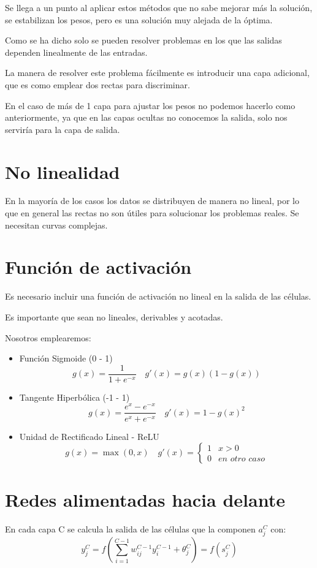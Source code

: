 \documentclass[12pt, twoside, openright]{report} %
\begin{document}
Se llega a un punto al aplicar estos métodos que no sabe mejorar más la solución, se estabilizan los pesos, pero es una solución muy alejada de la óptima.

Como se ha dicho solo se pueden resolver problemas en los que las salidas dependen linealmente de las entradas.

La manera de resolver este problema fácilmente es introducir una capa adicional, que es como emplear dos rectas para discriminar.

En el caso de más de 1 capa para ajustar los pesos no podemos hacerlo como anteriormente, ya que en las capas ocultas no conocemos la salida, solo nos serviría para la capa de salida.

\section{No linealidad}
En la mayoría de los casos los datos se distribuyen de manera no lineal, por lo que en general las rectas no son útiles para solucionar los problemas reales. Se necesitan curvas complejas.

\section{Función de activación}
Es necesario incluir una función de activación no lineal en la salida de las células. 

Es importante que sean no lineales, derivables y acotadas.
\pagebreak

Nosotros emplearemos:
\begin{itemize}
	\item Función Sigmoide (0 - 1)
	      $$g(x)=\frac{1}{1+e^{-x}}\quad g'(x)=g(x)(1-g(x))$$
	\item Tangente Hiperbólica (-1 - 1) $$g(x)=\frac{e^x-e^{-x}}{e^x+e^{-x}} \quad g'(x)=1-g(x)^2$$
	\item Unidad de Rectificado Lineal - ReLU $$g(x)=\max(0,x) \quad g'(x)= \begin{cases}1 & x > 0\\0 & \textit{en otro caso}\end{cases}$$
\end{itemize}

\section{Redes alimentadas hacia delante}
En cada capa C se calcula la salida de las células que la componen $a^C_j$ con: 
$$y^C_j=f\left(\sum^{C-1}_{i=1} w^{C-1}_{ij}y^{C-1}_i+\theta_j^C\right)=f(s^{C}_{j})$$
\end{document}
